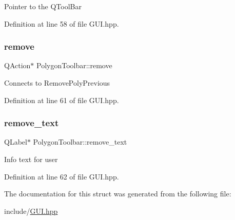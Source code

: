 Pointer to the Q\+Tool\+Bar 

Definition at line 58 of file G\+U\+I.\+hpp.

\mbox{\label{structPolygonToolbar_ad5f83fc2ac8daf17ae3014d05d3f5d5b}} 
\subsubsection{\texorpdfstring{remove}{remove}}
{\footnotesize\ttfamily Q\+Action$\ast$ Polygon\+Toolbar\+::remove}

Connects to Remove\+Poly\+Previous 

Definition at line 61 of file G\+U\+I.\+hpp.

\mbox{\label{structPolygonToolbar_ad396d8e37e491bb7bfa8bf91d318014c}} 
\subsubsection{\texorpdfstring{remove\+\_\+text}{remove\_text}}
{\footnotesize\ttfamily Q\+Label$\ast$ Polygon\+Toolbar\+::remove\+\_\+text}

Info text for user 

Definition at line 62 of file G\+U\+I.\+hpp.



The documentation for this struct was generated from the following file\+:\begin{DoxyCompactItemize}
\item 
include/\mbox{\hyperlink{GUI_8hpp}{G\+U\+I.\+hpp}}\end{DoxyCompactItemize}
